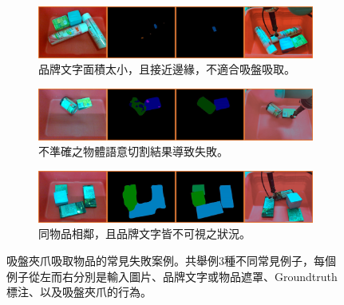 \begin{figure}[H]
  \centering
  \begin{subfigure}[b]{1.0\textwidth}
    \includegraphics[width=\textwidth]{./figures/5_obj_8_suction_fail_2.jpg}
    \caption{品牌文字面積太小，且接近邊緣，不適合吸盤吸取。}
    \label{fig:cylinder_suction_fail}
  \end{subfigure}
  \begin{subfigure}[b]{1.0\textwidth}
    \includegraphics[width=\textwidth]{./figures/5_obj_13_suction_fail_3.jpg}
    \caption{不準確之物體語意切割結果導致失敗。}
    \label{fig:cuboid_suction_fail}
  \end{subfigure}
  \begin{subfigure}[b]{1.0\textwidth}
    \includegraphics[width=\textwidth]{./figures/5_obj_14_suction_fail_1.jpg}
    \caption{同物品相鄰，且品牌文字皆不可視之狀況。}
    \label{fig:adjacent_suction_fail}
  \end{subfigure}
  \caption{吸盤夾爪吸取物品的常見失敗案例。共舉例3種不同常見例子，每個例子從左而右分別是輸入圖片、品牌文字或物品遮罩、Groundtruth標注、以及吸盤夾爪的行為。
}
  \label{fig:failure}
\end{figure}

